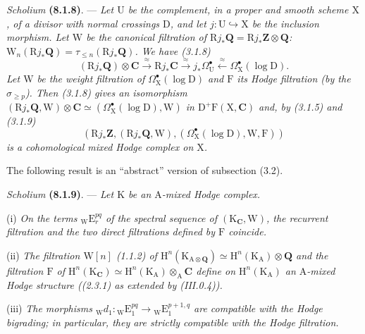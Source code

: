 \documentclass[11pt,leqno]{article}
\begin{document}
\textit{Scholium} \textbf{(8.1.8)}. — \textit{Let \(\mathrm{U}\) be the complement, in a proper and smooth scheme \(\mathrm{X}\), of a divisor with normal crossings \(\mathrm{D}\), and let \(j:\mathrm{U}\hookrightarrow\mathrm{X}\) be the inclusion morphism. Let \(\mathrm{W}\) be the canonical filtration of \(\mathrm{R}j_{\ast}\mathbf{Q}=\mathrm{R}j_{\ast}\mathbf{Z}\otimes\mathbf{Q}\): \(\mathrm{W}_{n}(\mathrm{R}j_{\ast}\mathbf{Q})=\tau_{\leq n}(\mathrm{R}j_{\ast}\mathbf{Q})\). We have (3.1.8)}
\[
(\mathrm{R}j_{\ast}\mathbf{Q})\otimes\mathbf{C}
\xrightarrow{\approx}\mathrm{R}j_{\ast}\mathbf{C}
\xrightarrow{\approx}j_{\ast}\Omega_{\mathrm{U}}^\bullet
\xleftarrow{\approx}\Omega_{\mathrm{X}}^\bullet(\log\mathrm{D}).
\]
\textit{Let \(\mathrm{W}\) be the weight filtration of \(\Omega_{\mathrm{X}}^\bullet(\log\mathrm{D})\) and \(\mathrm{F}\) its Hodge filtration (by the \(\sigma_{\geq p}\)). Then (3.1.8) gives an isomorphism \((\mathrm{R}j_{\ast}\mathbf{Q},\mathrm{W})\otimes\mathbf{C}\simeq(\Omega_{\mathrm{X}}^\bullet(\log\mathrm{D}),\mathrm{W})\) in \(\mathrm{D}^{+}\mathrm{F}(\mathrm{X},\mathbf{C})\) and, by (3.1.5) and (3.1.9)}
\[
(\mathrm{R}j_{\ast}\mathbf{Z},(\mathrm{R}j_{\ast}\mathbf{Q},\mathrm{W}),
(\Omega_{\mathrm{X}}^\bullet(\log\mathrm{D}),\mathrm{W},\mathrm{F}))
\]
\textit{is a cohomological mixed Hodge complex on \(\mathrm{X}\).}

The following result is an “abstract” version of subsection (3.2).

\textit{Scholium} \textbf{(8.1.9)}. — \textit{Let \(\mathrm{K}\) be an \(\mathrm{A}\)-mixed Hodge complex.}

(i) \textit{On the terms \({}_{\mathrm{W}}\mathrm{E}_{r}^{pq}\) of the spectral sequence of \((\mathrm{K}_{\mathbf{C}},\mathrm{W})\), the recurrent filtration and the two direct filtrations defined by \(\mathrm{F}\) coincide.}

(ii) \textit{The filtration \(\mathrm{W}[n]\) (1.1.2) of \(\mathrm{H}^{n}(\mathrm{K}_{\mathrm{A}\otimes\mathbf{Q}})\simeq\mathrm{H}^{n}(\mathrm{K}_{\mathrm{A}})\otimes\mathbf{Q}\) and the filtration \(\mathrm{F}\) of \(\mathrm{H}^{n}(\mathrm{K}_{\mathbf{C}})\simeq\mathrm{H}^{n}(\mathrm{K}_{\mathrm{A}})\otimes_{\mathrm{A}}\mathbf{C}\) define on \(\mathrm{H}^{n}(\mathrm{K}_{\mathrm{A}})\) an \(\mathrm{A}\)-mixed Hodge structure ((2.3.1) as extended by (III.0.4)).}

(iii) \textit{The morphisms \({}_{\mathrm{W}}d_{1}:{}_{\mathrm{W}}\mathrm{E}_{1}^{pq}\to{}_{\mathrm{W}}\mathrm{E}_{1}^{p+1,q}\) are compatible with the Hodge bigrading; in particular, they are strictly compatible with the Hodge filtration.}
\end{document}
